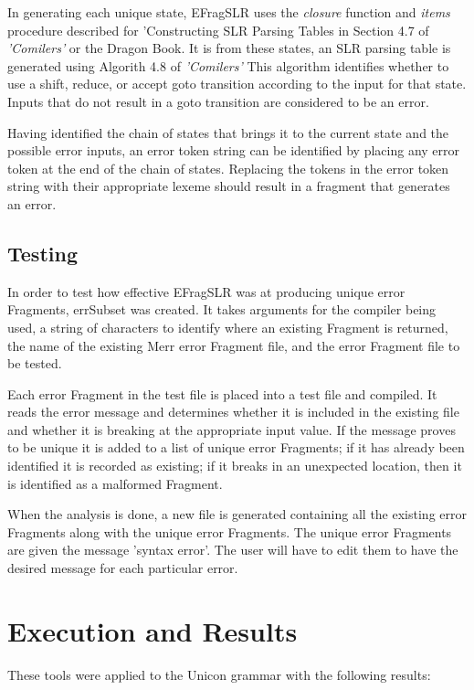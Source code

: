 \documentclass{article}
\begin{document}
In generating each unique state, EFragSLR uses the \emph{closure} function and \emph{items} procedure described for 'Constructing SLR Parsing Tables in Section 4.7 of \emph{'Comilers'} or the Dragon Book.  It is from these states, an SLR parsing table is generated using Algorith 4.8 of \emph{'Comilers'}  This algorithm identifies whether to use a shift, reduce, or accept goto transition according to the input for that state.  Inputs that do not result in a goto transition are considered to be an error.

Having identified the chain of states that brings it to the current state and the possible error inputs, an error token string can be identified by placing any error token at the end of the chain of states.  Replacing the tokens in the error token string with their appropriate lexeme should result in a fragment that generates an error.

\subsection{Testing}
In order to test how effective EFragSLR was at producing unique error Fragments, errSubset was created.  It takes arguments for the compiler being used, a string of characters to identify where an existing Fragment is returned, the name of the existing Merr error Fragment file, and the error Fragment file to be tested. 

Each error Fragment in the test file is placed into a test file and compiled.  It reads the error message and determines whether it is included in the existing file and whether it is breaking at the appropriate input value.  If the message proves to be unique it is added to a list of unique error Fragments; if it has already been identified it is recorded as existing; if it breaks in an unexpected location, then it is identified as a malformed Fragment.

When the analysis is done, a new file is generated containing all the existing error Fragments along with the unique error Fragments.  The unique error Fragments are given the message 'syntax error'.  The user will have to edit them to have the desired message for each particular error.

\section{Execution and Results}
These tools were applied to the Unicon grammar with the following results:
\end{document}
